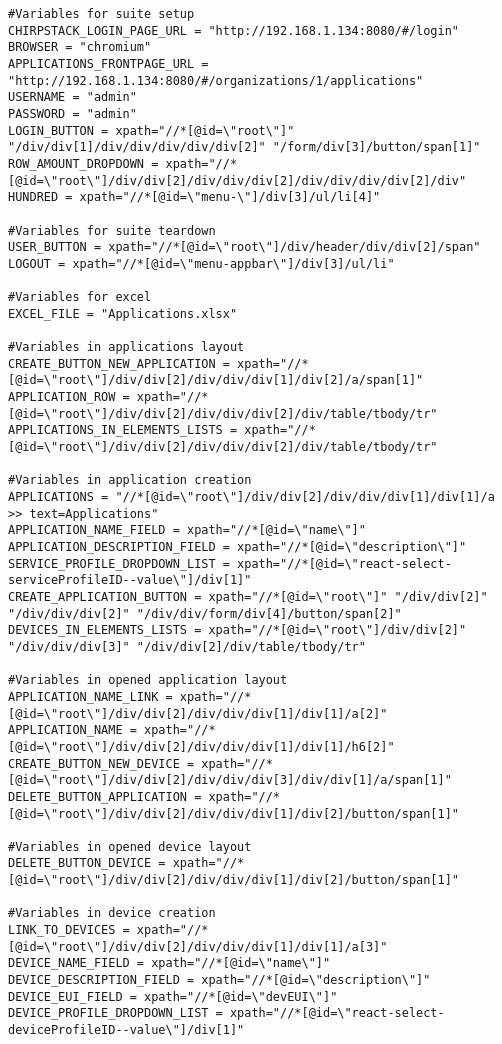 \begin{verbatim}
#Variables for suite setup
CHIRPSTACK_LOGIN_PAGE_URL = "http://192.168.1.134:8080/#/login"
BROWSER = "chromium"
APPLICATIONS_FRONTPAGE_URL = "http://192.168.1.134:8080/#/organizations/1/applications"
USERNAME = "admin"
PASSWORD = "admin"
LOGIN_BUTTON = xpath="//*[@id=\"root\"]" "/div/div[1]/div/div/div/div/div[2]" "/form/div[3]/button/span[1]"
ROW_AMOUNT_DROPDOWN = xpath="//*[@id=\"root\"]/div/div[2]/div/div/div[2]/div/div/div/div[2]/div"
HUNDRED = xpath="//*[@id=\"menu-\"]/div[3]/ul/li[4]"

#Variables for suite teardown
USER_BUTTON = xpath="//*[@id=\"root\"]/div/header/div/div[2]/span"
LOGOUT = xpath="//*[@id=\"menu-appbar\"]/div[3]/ul/li"

#Variables for excel
EXCEL_FILE = "Applications.xlsx"

#Variables in applications layout
CREATE_BUTTON_NEW_APPLICATION = xpath="//*[@id=\"root\"]/div/div[2]/div/div/div[1]/div[2]/a/span[1]"
APPLICATION_ROW = xpath="//*[@id=\"root\"]/div/div[2]/div/div/div[2]/div/table/tbody/tr"
APPLICATIONS_IN_ELEMENTS_LISTS = xpath="//*[@id=\"root\"]/div/div[2]/div/div/div[2]/div/table/tbody/tr"

#Variables in application creation
APPLICATIONS = "//*[@id=\"root\"]/div/div[2]/div/div/div[1]/div[1]/a >> text=Applications"
APPLICATION_NAME_FIELD = xpath="//*[@id=\"name\"]"
APPLICATION_DESCRIPTION_FIELD = xpath="//*[@id=\"description\"]"
SERVICE_PROFILE_DROPDOWN_LIST = xpath="//*[@id=\"react-select-serviceProfileID--value\"]/div[1]"
CREATE_APPLICATION_BUTTON = xpath="//*[@id=\"root\"]" "/div/div[2]" "/div/div/div[2]" "/div/div/form/div[4]/button/span[2]"
DEVICES_IN_ELEMENTS_LISTS = xpath="//*[@id=\"root\"]/div/div[2]" "/div/div/div[3]" "/div/div[2]/div/table/tbody/tr"

#Variables in opened application layout
APPLICATION_NAME_LINK = xpath="//*[@id=\"root\"]/div/div[2]/div/div/div[1]/div[1]/a[2]"
APPLICATION_NAME = xpath="//*[@id=\"root\"]/div/div[2]/div/div/div[1]/div[1]/h6[2]"
CREATE_BUTTON_NEW_DEVICE = xpath="//*[@id=\"root\"]/div/div[2]/div/div/div[3]/div/div[1]/a/span[1]"
DELETE_BUTTON_APPLICATION = xpath="//*[@id=\"root\"]/div/div[2]/div/div/div[1]/div[2]/button/span[1]"

#Variables in opened device layout
DELETE_BUTTON_DEVICE = xpath="//*[@id=\"root\"]/div/div[2]/div/div/div[1]/div[2]/button/span[1]"

#Variables in device creation
LINK_TO_DEVICES = xpath="//*[@id=\"root\"]/div/div[2]/div/div/div[1]/div[1]/a[3]"
DEVICE_NAME_FIELD = xpath="//*[@id=\"name\"]"
DEVICE_DESCRIPTION_FIELD = xpath="//*[@id=\"description\"]"
DEVICE_EUI_FIELD = xpath="//*[@id=\"devEUI\"]"
DEVICE_PROFILE_DROPDOWN_LIST = xpath="//*[@id=\"react-select-deviceProfileID--value\"]/div[1]"


\end{verbatim}
